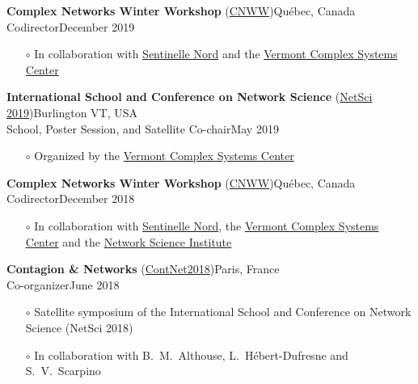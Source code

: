 \documentclass[11pt]{article}
\begin{document}
%
\parbox{\textwidth}{\textbf{Complex Networks Winter Workshop} (\href{https://sentinellenord.ulaval.ca/fr/reseauxcomplexes2019}{CNWW})\hfill Qu\'ebec, Canada\\
Codirector\hfill December 2019
\begin{itemize}[noitemsep, leftmargin=1.5em, topsep=0pt, after=\vspace{0.75\baselineskip}]\small
  \item[$\circ$] In collaboration with \href{http://sentinellenord.ulaval.ca/}{Sentinelle Nord} and the \href{http://www.vermontcomplexsystems.org/}{Vermont Complex Systems Center}
\end{itemize}}
%
\parbox{\textwidth}{\textbf{International School and Conference on Network Science} (\href{http://vermontcomplexsystems.org/events/netsci/}{NetSci 2019})\hfill Burlington VT, USA\\
School, Poster Session, and Satellite Co-chair\hfill May 2019
\begin{itemize}[noitemsep, leftmargin=1.5em, topsep=0pt, after=\vspace{0.75\baselineskip}]\small
  \item[$\circ$] Organized by the \href{http://www.vermontcomplexsystems.org/}{Vermont Complex Systems Center}
\end{itemize}}
%
\parbox{\textwidth}{\textbf{Complex Networks Winter Workshop} (\href{https://sentinellenord.ulaval.ca/fr/reseauxcomplexes2018}{CNWW})\hfill Qu\'ebec, Canada\\
Codirector\hfill December 2018
\begin{itemize}[noitemsep, leftmargin=1.5em, topsep=0pt, after=\vspace{0.75\baselineskip}]\small
  \item[$\circ$] In collaboration with \href{http://sentinellenord.ulaval.ca/}{Sentinelle Nord}, the \href{http://www.vermontcomplexsystems.org/}{Vermont Complex Systems Center} and the \href{https://www.networkscienceinstitute.org/}{Network Science Institute}
\end{itemize}}
%
\parbox{\textwidth}{\textbf{Contagion \& Networks} (\href{http://networkscontagion.github.io/}{ContNet2018})\hfill Paris, France\\
Co-organizer\hfill June 2018
\begin{itemize}[noitemsep, leftmargin=1.5em, topsep=0pt, after=\vspace{0.75\baselineskip}]\small
  \item[$\circ$] Satellite symposium of the International School and Conference on Network Science (NetSci 2018)
  \item[$\circ$] In collaboration with B.~M.~Althouse, L.~H\'ebert-Dufresne and S.~V.~Scarpino
\end{itemize}}
\end{document}
